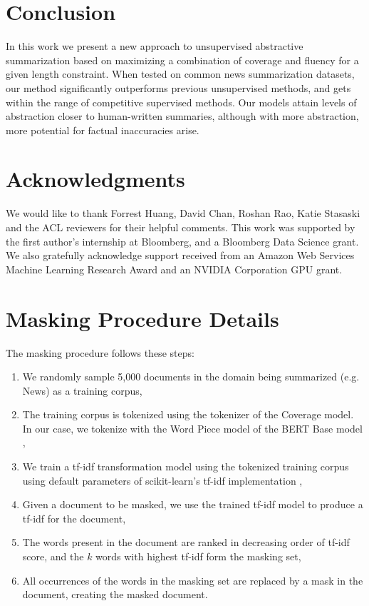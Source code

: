 \documentclass[11pt,a4paper]{article}
\begin{document}
\section{Conclusion}

In this work we present a new approach to unsupervised abstractive summarization based on maximizing a combination of coverage and fluency for a given length constraint. When tested on common news summarization datasets, our method significantly outperforms previous unsupervised methods, and gets within the range of competitive supervised methods. Our models attain levels of abstraction closer to human-written summaries, although with more abstraction, more potential for factual inaccuracies arise.

\section*{Acknowledgments}

We would like to thank Forrest Huang, David Chan, Roshan Rao, Katie Stasaski and the ACL reviewers for their helpful comments. This work was supported by the first author's internship at Bloomberg, and a Bloomberg Data Science grant. We also gratefully acknowledge support received from an Amazon Web Services Machine Learning Research Award and an NVIDIA Corporation GPU grant.




\clearpage
\appendix
\renewcommand{\thetable}{A\arabic{table}}
\setcounter{table}{0}
\renewcommand{\thefigure}{A\arabic{figure}}
\setcounter{figure}{0}

\section{Masking Procedure Details}
\label{appendix:masking}
The masking procedure follows these steps:
\begin{enumerate}
    \item We randomly sample 5,000 documents in the domain being summarized (e.g. News) as a training corpus,
    \item The training corpus is tokenized using the tokenizer of the Coverage model. In our case, we tokenize with the Word Piece model of the BERT Base model \cite{devlin2019bert},
    \item We train a tf-idf transformation model using the tokenized training corpus using default parameters of scikit-learn's tf-idf implementation \cite{scikit-learn},
    \item Given a document to be masked, we use the trained tf-idf model to produce a tf-idf for the document,
    \item The words present in the document are ranked in decreasing order of tf-idf score, and the $k$ words with highest tf-idf form the masking set,
    \item All occurrences of the words in the masking set are replaced by a mask in the document, creating the masked document.
\end{enumerate}
\end{document}
